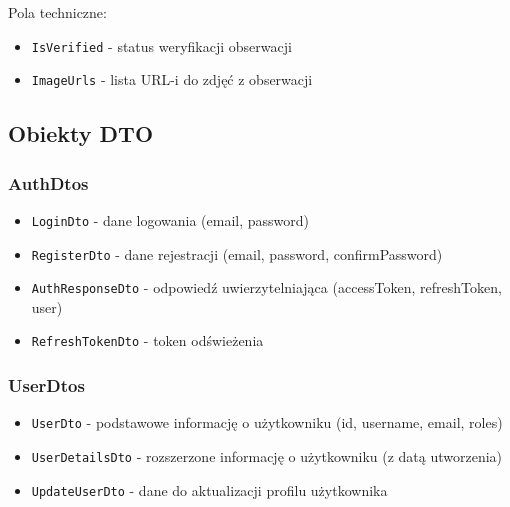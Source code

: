 Pola techniczne:
\begin{itemize}
	\item \texttt{IsVerified} - status weryfikacji obserwacji
	\item \texttt{ImageUrls} - lista URL-i do zdjęć z obserwacji
\end{itemize}

\subsection{Obiekty DTO}

\subsubsection{AuthDtos}
\begin{itemize}
	\item \texttt{LoginDto} - dane logowania (email, password)
	\item \texttt{RegisterDto} - dane rejestracji (email, password, confirmPassword)
	\item \texttt{AuthResponseDto} - odpowiedź uwierzytelniająca (accessToken, refreshToken, user)
	\item \texttt{RefreshTokenDto} - token odświeżenia
\end{itemize}

\subsubsection{UserDtos}
\begin{itemize}
	\item \texttt{UserDto} - podstawowe informację o użytkowniku (id, username, email, roles)
	\item \texttt{UserDetailsDto} - rozszerzone informację o użytkowniku (z datą utworzenia)
	\item \texttt{UpdateUserDto} - dane do aktualizacji profilu użytkownika
\end{itemize}

